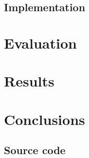 \documentclass{scrreprt}
\begin{document}
\cite{Kordy2012}


\section{Implementation}

\chapter{Evaluation}



\chapter{Results}

\chapter{Conclusions}




\newpage
\begin{appendices}

\chapter{Source code}

\end{appendices}
\end{document}
